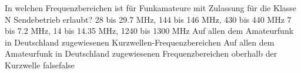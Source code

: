     {In welchen Frequenzbereichen ist für Funkamateure mit Zulassung für die Klasse N Sendebetrieb erlaubt?}
    {28 bis 29.7 MHz, 144 bis 146 MHz, 430 bis 440 MHz}
    {7 bis 7.2 MHz, 14 bis 14.35 MHz, 1240 bis 1300 MHz}
    {Auf allen dem Amateurfunk in Deutschland zugewiesenen Kurzwellen-Frequenzbereichen}
    {Auf allen dem Amateurfunk in Deutschland zugewiesenen Frequenzbereichen oberhalb der Kurzwelle}
    {false}{false}